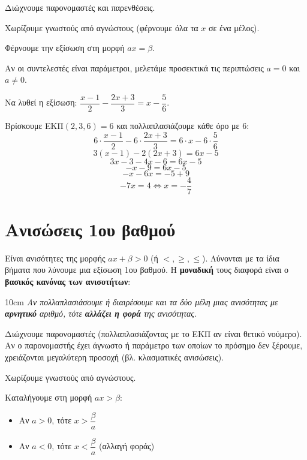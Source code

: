 \bhmata
\begin{bhma}
    \item Διώχνουμε παρονομαστές και παρενθέσεις.
    \item Χωρίζουμε γνωστούς από αγνώστους (φέρνουμε όλα τα $x$ σε ένα μέλος).
    \item Φέρνουμε την εξίσωση στη μορφή $a x = \beta$.
    \item Αν οι συντελεστές είναι παράμετροι, μελετάμε προσεκτικά τις περιπτώσεις $a = 0$ και $a \neq 0$.
\end{bhma}


Να λυθεί η εξίσωση: $\dfrac{x-1}{2} - \dfrac{2x+3}{3} = x - \dfrac{5}{6}$.

\lysh
Βρίσκουμε ΕΚΠ$(2, 3, 6) = 6$ και πολλαπλασιάζουμε κάθε όρο με $6$:
\[ 6 \cdot \dfrac{x-1}{2} - 6 \cdot \dfrac{2x+3}{3} = 6 \cdot x - 6 \cdot \dfrac{5}{6} \]
\[ 3(x-1) - 2(2x+3) = 6x - 5 \]
\[ 3x - 3 - 4x - 6 = 6x - 5 \]
\[ -x - 9 = 6x - 5 \]
\[ -x - 6x = -5 + 9 \]
\[ -7x = 4 \Leftrightarrow x = -\dfrac{4}{7} \]

\section{Ανισώσεις 1ου βαθμού}

Είναι ανισότητες της μορφής $a x + \beta > 0$ (ή $<, \ge, \le$). Λύνονται με τα ίδια βήματα που λύνουμε μια εξίσωση 1ου βαθμού.
Η \textbf{μοναδική} τους διαφορά είναι ο \textbf{βασικός κανόνας των ανισοτήτων}: 
\begin{center}
\begin{prosoxi}{10cm}
\textit{Αν πολλαπλασιάσουμε ή διαιρέσουμε και τα δύο μέλη μιας ανισότητας με \textbf{αρνητικό} αριθμό, τότε \textbf{αλλάζει η φορά} της ανισότητας.}
\end{prosoxi}
\end{center}

\bhmata
\begin{bhma}
    \item Διώχνουμε παρονομαστές (πολλαπλασιάζοντας με το ΕΚΠ αν είναι θετικό νούμερο). Αν ο παρονομαστής έχει άγνωστο ή παράμετρο των οποίων το πρόσημο δεν ξέρουμε, χρειάζονται μεγαλύτερη προσοχή (βλ. κλασματικές ανισώσεις).
    \item Χωρίζουμε γνωστούς από αγνώστους.
    \item Καταλήγουμε στη μορφή $a x > \beta$:
      \begin{itemize}
          \item Αν $a > 0$, τότε $x > \dfrac{\beta}{a}$
          \item Αν $a < 0$, τότε $x < \dfrac{\beta}{a}$ (αλλαγή φοράς)
      \end{itemize}
\end{bhma}


